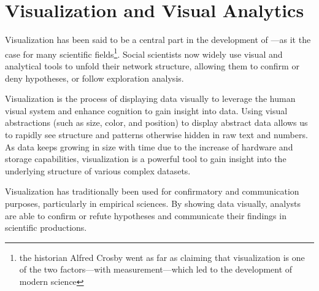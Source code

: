 \section{Visualization and Visual Analytics}

Visualization has been said to be a central part in the development of \sna\cite{freemanVisualizingSocialNetworks2000, wolfeRiseNetworkThinking1978}---as it the case for many scientific fields\footnote{the historian Alfred Crosby went as far as claiming that visualization is one of the two factors---with measurement---which led to the development of modern science\cite{crosbyMeasureReality1998}}.
Social scientists now widely use visual and analytical tools to unfold their network structure, allowing them to confirm or deny hypotheses, or follow exploration analysis.

Visualization is the process of displaying data visually to leverage the human visual system and enhance cognition to gain insight into data\cite{cardReadingsInformationVisualization1999}.
Using visual abstractions (such as size, color, and position) to display abstract data allows us to rapidly see structure and patterns otherwise hidden in raw text and numbers.
As data keeps growing in size with time due to the increase of hardware and storage capabilities, visualization is a powerful tool to gain insight into the underlying structure of various complex datasets.

Visualization has traditionally been used for confirmatory and communication purposes, particularly in empirical sciences\cite{shneidermanInventingDiscoveryTools2002}.
By showing data visually, analysts are able to confirm or refute hypotheses and communicate their findings in scientific productions.


